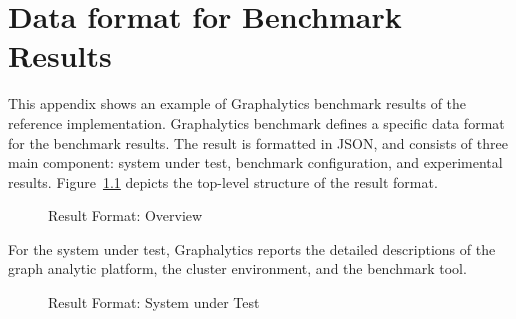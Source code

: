 \chapter{Data format for Benchmark Results}
\label{chap:data-format}
This appendix shows an example of Graphalytics benchmark results of the reference implementation. Graphalytics benchmark defines a specific data format for the benchmark results. The result is formatted in JSON, and consists of three main component: system under test, benchmark configuration, and experimental results. Figure~\ref{fig:result-format:overview} depicts the top-level structure of the result format.

\begin{figure}[h]
	\centering
	\caption{Result Format: Overview}
	\label{fig:result-format:overview}
\end{figure}

For the system under test, Graphalytics reports the detailed descriptions of the graph analytic platform, the cluster environment, and the benchmark tool.

\begin{figure}[!h]
	\centering
	\caption{Result Format: System under Test}
	\label{fig:result-format:system}
\end{figure}

